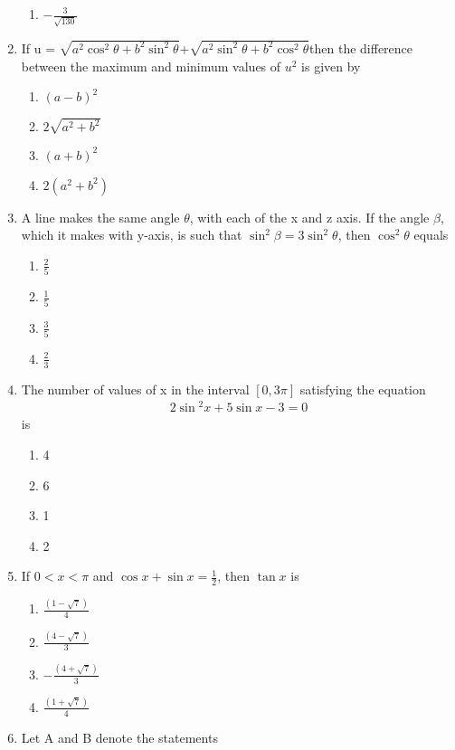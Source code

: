 \begin{enumerate}[label=\arabic*.,ref=\thesubsection.\theenumi]
\begin{enumerate}
        \item ${-\frac{3}{\sqrt{130}}}$
    \end{enumerate}
    \item If u = $\sqrt{a^2\cos^2\theta +b^2\sin^2\theta}$+$\sqrt{a^2\sin^2\theta +b^2\cos^2\theta}$then the difference between the maximum and minimum values of $u^2$ is given by
    \begin{enumerate}
        \item $(a - b) ^2$
        \item $2\sqrt{a^2 + b^2}$
        \item $(a + b) ^2$
        \item $2 (a^2+b^2)$
    \end{enumerate}
    \item A line makes the same angle $\theta$, with each of the x and z axis. If the angle $\beta$, which it makes with y-axis, is such that $\sin^2\beta = 3\sin^2\theta$, then $\cos^2\theta$ equals
    \begin{enumerate}
        \item ${\frac{2}{5}}$
        \item ${\frac{1}{5}}$
        \item ${\frac{3}{5}}$
        \item ${\frac{2}{3}}$
    \end{enumerate}
    \item The number of values of x in the interval $[0, 3\pi]$ satisfying the equation 
    \begin{align}
    2\sin{^2x} + 5\sin{x} -3 =0
    \end{align} is
    \begin{enumerate}
        \item 4
        \item 6
        \item 1
        \item 2
    \end{enumerate}
    \item If $0< x<\pi$ and $\cos x+\sin x={\frac{1}{2}} $, then $\tan x$ is 
    \begin{enumerate}
        \item ${\frac{(1-\sqrt7)}{4}}$
        \item ${\frac{(4-\sqrt7)}{3}}$
        \item ${-\frac{(4+\sqrt7)}{3}}$
        \item ${\frac{(1+\sqrt7)}{4}}$
    \end{enumerate}
    \item Let A and B denote the statements\\

\end{enumerate}
